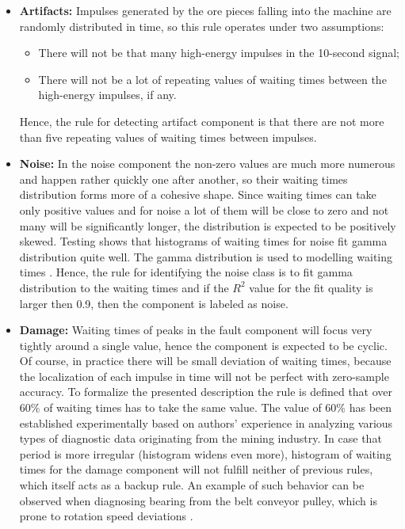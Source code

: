 \documentclass[3p,times]{elsarticle}
\begin{document}
\begin{itemize}
  \item \textbf{Artifacts:} Impulses generated by the ore pieces falling into the machine are randomly distributed in time, so this rule operates under two assumptions: 
  \begin{itemize}
    \item There will not be that many high-energy impulses in the 10-second signal;
    \item There will not be a lot of repeating values of waiting times between the high-energy impulses, if any.
  \end{itemize}
  Hence, the rule for detecting artifact component is that there are not more than five repeating values of waiting times between impulses. 
  
  
  \item \textbf{Noise:} In the noise component the non-zero values are much more numerous and happen rather quickly one after another, so their waiting times distribution
  forms more of a cohesive shape. Since waiting times can take only positive values and for noise a lot of them will be close to zero and not many will be significantly longer, the distribution is expected to be positively skewed. Testing shows that histograms of waiting times for noise fit gamma distribution quite well. The gamma distribution is used to modelling waiting times \cite{guo2011modelling}. Hence, the rule for identifying the noise class is to fit gamma distribution to the waiting times and if the $R^2$ value for the fit quality is larger then 0.9, then the component is labeled as noise.


  \item \textbf{Damage:} Waiting times of peaks in the fault component will focus very tightly around a single value, hence the component is expected to be cyclic. Of course, in practice there will be small deviation of waiting times, because the localization of each impulse in time will not be perfect with zero-sample accuracy. To formalize the presented description the rule is defined that over $60\%$ of waiting times has to take the same value. The value of $60\%$ has been established experimentally based on authors' experience in analyzing various types of diagnostic data originating from the mining industry. In case that period is more irregular (histogram widens even more), histogram of waiting times for the damage component will not fulfill neither of previous rules, which itself acts as a backup rule. An example of such behavior can be observed when diagnosing bearing from the belt conveyor pulley, which is prone to rotation speed deviations \cite{wodecki2018optimal}.

\end{itemize}
\end{document}
